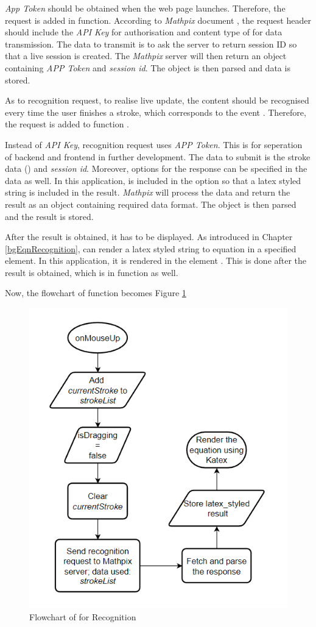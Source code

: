 \documentclass[12pt,twoside]{report}
\begin{document}
\textit{App Token} should be obtained when the web page launches. Therefore, the
request is added in  function. According to \textit{Mathpix}
document \cite{web:mathpixdoc}, the request header should include the \textit{API Key} for authorisation and content type of  for data transmission. The data to transmit is to ask the server to return session ID so that a live session is created. The \textit{Mathpix} server will then return an object containing \textit{APP Token} and \textit{session id}. The object is then parsed and data is stored.

As to recognition request, to realise live update, the content should be recognised every time the user finishes a stroke, which corresponds to the event . Therefore, the request is added to function . 

Instead of \textit{API Key}, recognition request uses \textit{APP Token}. This
is for seperation of backend and frontend in further development. The data to
submit is the stroke data () and \textit{session id}. Moreover,
options for the response can be specified in the data as well. In this
application,  is included in the option so that a latex styled string is included in the result. \textit{Mathpix}
will process the data and return the result as an object containing required
data format. The object is then parsed and the  result is stored.

After the result is obtained, it has to be displayed. As introduced in Chapter \ref{bgEqnRecognition},  can render a latex styled string to equation in a specified element. In this application, it is rendered in the element . This is done after the result is obtained, which is in function  as well.

Now, the flowchart of function  becomes Figure \ref{fig:flowchart2}
\begin{figure}[h]
    \centering
    \includegraphics[width=0.6\linewidth]{figures/flowchart2.png}
    \caption{Flowchart of  for Recognition}
    \label{fig:flowchart2}
\end{figure}
\end{document}
